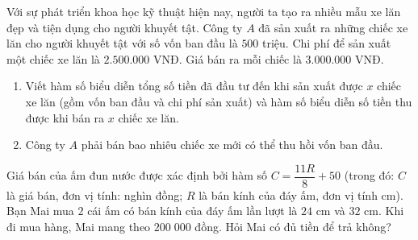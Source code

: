 \begin{bt}%
	Với sự phát triển khoa học kỹ thuật hiện nay, người ta tạo ra nhiều mẫu xe lăn đẹp và tiện dụng cho người khuyết tật. Công ty $A$ đã sản xuất ra những chiếc xe lăn cho người khuyết tật với số vốn ban đầu là $500$ triệu. Chi phí để sản xuất một chiếc xe lăn là $2.500.000$ VNĐ. Giá bán ra mỗi chiếc là $3.000.000$ VNĐ.
	\begin{enumerate}
		\item Viết hàm số biểu diễn tổng số tiền đã đầu tư đến khi sản xuất được $x$ chiếc xe lăn (gồm vốn ban đầu và chi phí sản xuất) và hàm số biểu diễn số tiền thu được khi bán ra $x$ chiếc xe lăn.
		\item Công ty $A$ phải bán bao nhiêu chiếc xe mới có thể thu hồi vốn ban đầu.
	\end{enumerate}
\end{bt}

\begin{bt}%
Giá bán của ấm đun nước được xác định bởi hàm số $C=\dfrac{11R}{8}+50$  (trong đó: $C$ là giá bán, đơn vị tính: nghìn đồng; $R$ là bán kính của đáy ấm, đơn vị tính cm). Bạn Mai mua $2$ cái ấm có bán kính của đáy ấm lần lượt là $24$ cm và $32$ cm. Khi đi mua hàng, Mai mang theo $200\;000$ đồng. Hỏi Mai có đủ tiền để trả không?  	
\end{bt}

